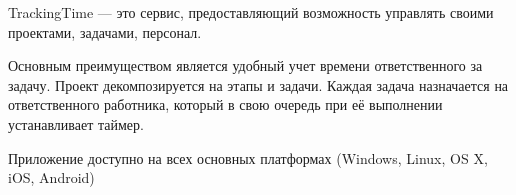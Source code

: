 
TrackingTime --- это сервис, предоставляющий возможность управлять своими проектами, задачами, персонал.

Основным преимуществом является удобный учет времени ответственного за задачу. 
Проект декомпозируется на этапы и задачи.
Каждая задача назначается на ответственного работника, который в свою очередь при её выполнении устанавливает таймер.

Приложение доступно на всех основных платформах (Windows, Linux, OS X, iOS, Android)